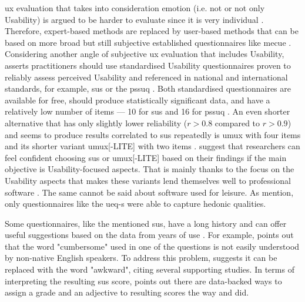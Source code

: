 \gls{ux} evaluation that takes into consideration emotion (i.e. not or not only Usability) is argued to be harder to evaluate since it is very individual \parencite{Juergen_et_all_2020}.
Therefore, expert-based methods are replaced by user-based methods that can be based on more broad but still subjective established questionnaires like \gls{mecue} \parencite{Juergen_et_all_2020}.
Considering another angle of subjective \gls{ux} evaluation that includes Usability, \textcite{Lewis_2014} asserts practitioners should use standardised Usability questionnaires proven to reliably assess perceived Usability and referenced in national and international standards, for example, \gls{sus} \parencite{Lewis_2018} or the \gls{pssuq} \parencite{Lewis_1995, Lewis_2002}.
Both standardised questionnaires are available for free, should produce statistically significant data, and have a relatively low number of items --- 10 for \gls{sus} and 16 for \gls{pssuq} \parencite{Lewis_2014}.
An even shorter alternative that has only slightly lower reliability ($r>0.8$ compared to $r>0.9$) and seems to produce results correlated to \gls{sus} repeatedly is \gls{umux} with four items and its shorter variant \gls{umux}[-LITE] with two items \parencite{Lewis_2014,Lewis_2018}.
\textcite{Schrepp_Kollmorge_Thomaschewski_2023} suggest that researchers can feel confident choosing \gls{sus} or \gls{umux}[-LITE] based on their findings if the main objective is Usability-focused aspects.
That is mainly thanks to the focus on the Usability aspects that makes these variants lend themselves well to professional software \parencite{Schrepp_Kollmorge_Thomaschewski_2023}.
The same cannot be said about software used for leisure.
As \textcite{Schrepp_Kollmorge_Thomaschewski_2023} mention, only questionnaires like the \gls{ueq-s} were able to capture hedonic qualities.

\label{sec:sus-evaluation}

Some questionnaires, like the mentioned \gls{sus}, have a long history and can offer useful suggestions based on the data from years of use \parencite{brooke_2013}.
For example, \textcite[p. 35]{brooke_2013} points out that the word "cumbersome" used in one of the questions is not easily understood by non-native English speakers.
To address this problem, \textcite[p. 35]{brooke_2013} suggests it can be replaced with the word "awkward", citing several supporting studies.
In terms of interpreting the resulting \gls{sus} score, \textcite[pp. 36-37]{brooke_2013} points out there are data-backed ways to assign a grade and an adjective to resulting scores the way \textcite{bangor_determining_2009} and \textcite{sauro_practical_2011} did.

